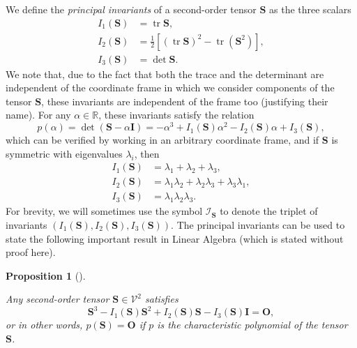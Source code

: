 \documentclass[
  letterpaper,
  DIV=11,
  numbers=noendperiod]{scrreprt}
\theoremstyle{plain}
\newtheorem{proposition}{Proposition}[chapter]
\theoremstyle{remark}
\begin{document}
We define the \emph{principal invariants} of a second-order tensor
\({\boldsymbol{S}}\) as the three scalars \[\begin{aligned}
  I_1({\boldsymbol{S}}) &= {\operatorname{tr}}{\boldsymbol{S}},\\
  I_2({\boldsymbol{S}}) &= \tfrac12[({\operatorname{tr}}{\boldsymbol{S}})^2-{\operatorname{tr}}({\boldsymbol{S}}^2)],\\
  I_3({\boldsymbol{S}}) &= \det{\boldsymbol{S}}.
\end{aligned}\] We note that, due to the fact that both the trace and
the determinant are independent of the coordinate frame in which we
consider components of the tensor \({\boldsymbol{S}}\), these invariants
are independent of the frame too (justifying their name). For any
\(\alpha\in{\mathbb{R}}\), these invariants satisfy the relation
\[p(\alpha) = \det({\boldsymbol{S}}-\alpha {\boldsymbol{I}}) = -\alpha^3+I_1({\boldsymbol{S}})\alpha^2-I_2({\boldsymbol{S}})\alpha+I_3({\boldsymbol{S}}),\]
which can be verified by working in an arbitrary coordinate frame, and
if \({\boldsymbol{S}}\) is symmetric with eigenvalues \(\lambda_i\),
then \[\begin{aligned}
  I_1({\boldsymbol{S}}) &= \lambda_1+\lambda_2+\lambda_3,\\
  I_2({\boldsymbol{S}}) &= \lambda_1\lambda_2+\lambda_2\lambda_3+\lambda_3\lambda_1,\\
  I_3({\boldsymbol{S}}) &= \lambda_1\lambda_2\lambda_3.
\end{aligned}\] For brevity, we will sometimes use the symbol
\({\mathcal{I}}_{{\boldsymbol{S}}}\) to denote the triplet of invariants
\((I_1({\boldsymbol{S}}),I_2({\boldsymbol{S}}),I_3({\boldsymbol{S}}))\).
The principal invariants can be used to state the following important
result in Linear Algebra (which is stated without proof here).

\begin{proposition}[]\protect\hypertarget{prp-CayleyHamilton}{}\label{prp-CayleyHamilton}

Any second-order tensor \({\boldsymbol{S}}\in{\mathcal{V}}^2\) satisfies
\[{\boldsymbol{S}}^3-I_1({\boldsymbol{S}}){\boldsymbol{S}}^2+I_2({\boldsymbol{S}}){\boldsymbol{S}}-I_3({\boldsymbol{S}}){\boldsymbol{I}}={\boldsymbol{O}},\]
or in other words, \(p({\boldsymbol{S}})={\boldsymbol{O}}\) if \(p\) is
the characteristic polynomial of the tensor \({\boldsymbol{S}}\).

\end{proposition}
\end{document}
